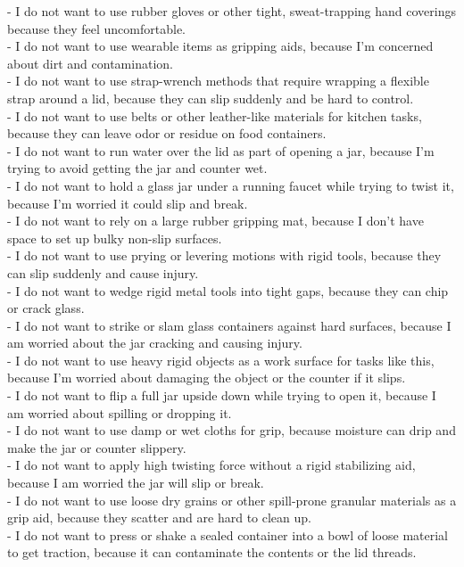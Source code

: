 \documentclass{llmxive}
\begin{document}
\begin{tcolorbox}
- I do not want to use rubber gloves or other tight, sweat-trapping hand coverings because they feel uncomfortable.\\
- I do not want to use wearable items as gripping aids, because I’m concerned about dirt and contamination.\\
- I do not want to use strap-wrench methods that require wrapping a flexible strap around a lid, because they can slip suddenly and be hard to control.\\
- I do not want to use belts or other leather-like materials for kitchen tasks, because they can leave odor or residue on food containers.\\
- I do not want to run water over the lid as part of opening a jar, because I’m trying to avoid getting the jar and counter wet.\\
- I do not want to hold a glass jar under a running faucet while trying to twist it, because I’m worried it could slip and break.\\
- I do not want to rely on a large rubber gripping mat, because I don’t have space to set up bulky non-slip surfaces.\\
- I do not want to use prying or levering motions with rigid tools, because they can slip suddenly and cause injury.\\
- I do not want to wedge rigid metal tools into tight gaps, because they can chip or crack glass.\\
- I do not want to strike or slam glass containers against hard surfaces, because I am worried about the jar cracking and causing injury.\\
- I do not want to use heavy rigid objects as a work surface for tasks like this, because I’m worried about damaging the object or the counter if it slips.\\
- I do not want to flip a full jar upside down while trying to open it, because I am worried about spilling or dropping it.\\
- I do not want to use damp or wet cloths for grip, because moisture can drip and make the jar or counter slippery.\\
- I do not want to apply high twisting force without a rigid stabilizing aid, because I am worried the jar will slip or break.\\
- I do not want to use loose dry grains or other spill-prone granular materials as a grip aid, because they scatter and are hard to clean up.\\
- I do not want to press or shake a sealed container into a bowl of loose material to get traction, because it can contaminate the contents or the lid threads.\\

\end{tcolorbox}
\end{document}
